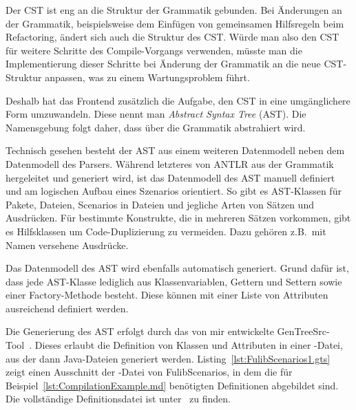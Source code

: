 Der CST ist eng an die Struktur der Grammatik gebunden.
Bei Änderungen an der Grammatik, beispielsweise dem Einfügen von gemeinsamen Hilfsregeln beim Refactoring,
ändert sich auch die Struktur des CST\@.
Würde man also den CST für weitere Schritte des Compile-Vorgangs verwenden,
müsste man die Implementierung dieser Schritte bei Änderung der Grammatik an die neue CST-Struktur anpassen,
was zu einem Wartungsproblem führt.

Deshalb hat das Frontend zusätzlich die Aufgabe, den CST in eine umgänglichere Form umzuwandeln.
Diese nennt man \emph{Abstract Syntax Tree} (AST).
Die Namensgebung folgt daher, dass über die Grammatik abstrahiert wird.

Technisch gesehen besteht der AST aus einem weiteren Datenmodell neben dem Datenmodell des Parsers.
Während letzteres von ANTLR aus der Grammatik hergeleitet und generiert wird,
ist das Datenmodell des AST manuell definiert und am logischen Aufbau eines Szenarios orientiert.
So gibt es AST-Klassen für Pakete, Dateien, Scenarios in Dateien und jegliche Arten von Sätzen und Ausdrücken.
Für bestimmte Konstrukte, die in mehreren Sätzen vorkommen, gibt es Hilfsklassen um Code-Duplizierung zu vermeiden.
Dazu gehören z.B.\ mit Namen versehene Ausdrücke.

Das Datenmodell des AST wird ebenfalls automatisch generiert.
Grund dafür ist, dass jede AST-Klasse lediglich aus Klassenvariablen, Gettern und Settern sowie einer Factory-Methode besteht.
Diese können mit einer Liste von Attributen ausreichend definiert werden.

Die Generierung des AST erfolgt durch das von mir entwickelte GenTreeSrc-Tool~\cite{gentreesrc}.
Dieses erlaubt die Definition von Klassen und Attributen in einer -Datei,
aus der dann Java-Dateien generiert werden.
Listing~\ref{lst:FulibScenarios1.gts} zeigt einen Ausschnitt der -Datei von FulibScenarios,
in dem die für Beispiel~\ref{lst:CompilationExample.md} benötigten Definitionen abgebildet sind.
Die vollständige Definitionsdatei ist unter~\cite{gts-definitions} zu finden.


